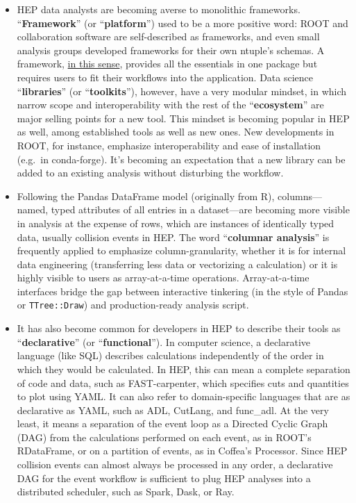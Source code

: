 \documentclass{article}
\begin{document}
\begin{itemize}
\item HEP data analysts are becoming averse to monolithic frameworks. ``{\bf Framework}'' (or ``{\bf platform}'') used to be a more positive word: ROOT and collaboration software are self-described as frameworks, and even small analysis groups developed frameworks for their own ntuple's schemas. A framework, \href{https://root.cern.ch/root/htmldoc/guides/users-guide/ROOTUsersGuide.html#the-framework}{in this sense}, provides all the essentials in one package but requires users to fit their workflows into the application. Data science ``{\bf libraries}'' (or ``{\bf toolkits}''), however, have a very modular mindset, in which narrow scope and interoperability with the rest of the ``{\bf ecosystem}'' are major selling points for a new tool. This mindset is becoming popular in HEP as well, among established tools as well as new ones. New developments in ROOT, for instance, emphasize interoperability and ease of installation (e.g.\ in conda-forge). It's becoming an expectation that a new library can be added to an existing analysis without disturbing the workflow.

\item Following the Pandas DataFrame model (originally from R), columns---named, typed attributes of all entries in a dataset---are becoming more visible in analysis at the expense of rows, which are instances of identically typed data, usually collision events in HEP. The word ``{\bf columnar analysis}'' is frequently applied to emphasize column-granularity, whether it is for internal data engineering (transferring less data or vectorizing a calculation) or it is highly visible to users as array-at-a-time operations. Array-at-a-time interfaces bridge the gap between interactive tinkering (in the style of Pandas or {\tt TTree::Draw}) and production-ready analysis script.

\item It has also become common for developers in HEP to describe their tools as ``{\bf declarative}'' (or ``{\bf functional}''). In computer science, a declarative language (like SQL) describes calculations independently of the order in which they would be calculated. In HEP, this can mean a complete separation of code and data, such as FAST-carpenter, which specifies cuts and quantities to plot using YAML. It can also refer to domain-specific languages that are as declarative as YAML, such as ADL, CutLang, and func\_adl. At the very least, it means a separation of the event loop as a Directed Cyclic Graph (DAG) from the calculations performed on each event, as in ROOT's RDataFrame, or on a partition of events, as in Coffea's Processor. Since HEP collision events can almost always be processed in any order, a declarative DAG for the event workflow is sufficient to plug HEP analyses into a distributed scheduler, such as Spark, Dask, or Ray.
\end{itemize}
\end{document}
